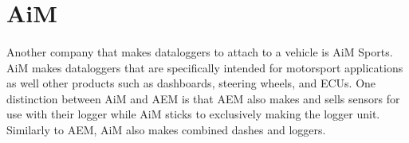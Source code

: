 \section{AiM}

\paragraph{}
Another company that makes dataloggers to attach to a vehicle is AiM Sports.
AiM makes dataloggers that are specifically intended for motorsport applications as well other products such as dashboards, steering wheels, and ECUs.
One distinction between AiM and AEM is that AEM also makes and sells sensors for use with their logger while AiM sticks to exclusively making the logger unit.
Similarly to AEM, AiM also makes combined dashes and loggers.